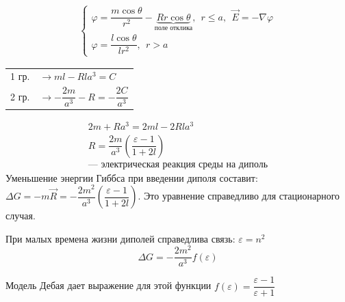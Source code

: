 \begin{lecture}
\begin{lecSection}
		\begin{gather*}
			\begin{cases}
				\varphi = \dfrac{m \cos \theta}{r^2} - \underbrace{R r \cos \theta}_{ \text{поле отклика} }, ~~ r \leq a, ~~ \vec{E} = - \nabla \varphi \\
				\varphi = \dfrac{l \cos \theta}{l r^2}, ~~ r > a
			\end{cases}
		\end{gather*}
		\begin{center}\begin{tabular}{cl}
			1 гр. & $ \rightarrow ml - R l a^3 = C $ \\
			2 гр. & $ \rightarrow -\dfrac{2m}{a^3} - R = -\dfrac{2C}{a^3} $ \\
		\end{tabular}\end{center}
		\hspace{2cm}
		\begin{gather}
			\nonumber
			2m + R a^3 = 2 ml - 2Rl a^3 \\
			\boxed{ R = \dfrac{2m}{a^3} \left( \dfrac{\varepsilon - 1}{1 + 2l} \right) } \\
			\nonumber
			\text{--- электрическая реакция среды на диполь}
		\end{gather}
		Уменьшение энергии Гиббса при введении диполя составит: $ \Delta G = - m \vec{R} = - \dfrac{2 m^2}{a^3} \left( \dfrac{\varepsilon - 1}{1 + 2l} \right) $. Это уравнение справедливо для стационарного случая.
		
		При малых времена жизни диполей справедлива связь: $ \varepsilon = n^2 $
		\begin{equation}
			\Delta G = - \dfrac{2 m^2}{a^3} f( \varepsilon )
			\label{eq:deltaG_from_epsilon}
		\end{equation}
		
		Модель Дебая дает выражение для этой функции $ f( \varepsilon) = \dfrac{\varepsilon - 1}{ \varepsilon + 1} $
		

\end{lecSection}
\end{lecture}
